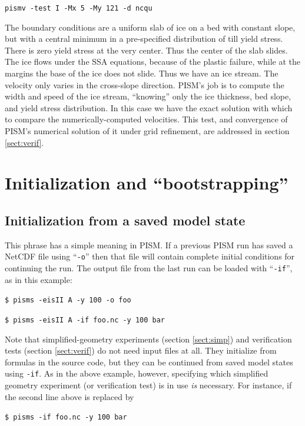 \documentclass[11pt,final]{amsart}
\begin{document}
\verb|pismv -test I -Mx 5 -My 121 -d ncqu|

\noindent The boundary conditions are a uniform slab of ice on a bed with constant slope, but with a central minimum in a pre-specified distribution of till yield stress.  There is zero yield stress at the very center.  Thus the center of the slab slides.  The ice flows under the SSA equations, because of the plastic failure, while at the margins the base of the ice does not slide.  Thus we have an ice stream.  The velocity only varies in the cross-slope direction.  PISM's job is to compute the width and speed of the ice stream, ``knowing'' only the ice thickness, bed slope, and yield stress distribution.  In this case we have the exact solution with which to compare the numerically-computed velocities.  This test, and convergence of PISM's numerical solution of it under grid refinement, are addressed in section \ref{sect:verif}.





\clearpage
\newpage
\section{Initialization and ``bootstrapping''}\label{sect:boot}  

\subsection{Initialization from a saved model state}  This phrase has a simple meaning in PISM.  If a previous PISM run has saved a NetCDF file using ``\verb|-o|'' then that file will contain complete initial conditions for continuing the run.  The output file from the last run can be loaded with ``\verb|-if|'', as in this example:

\verb|$ pisms -eisII A -y 100 -o foo|

\verb|$ pisms -eisII A -if foo.nc -y 100 bar|

\smallskip

Note that simplified-geometry experiments (section \ref{sect:simp}) and verification tests (section \ref{sect:verif}) do not need input files at all.  They initialize from formulas in the source code, but they can be continued from saved model states using \verb|-if|.  As in the above example, however, specifying which simplified geometry experiment (or verification test) is in use \emph{is} necessary.  For instance, if the second line above is replaced by

\verb|$ pisms -if foo.nc -y 100 bar|
\end{document}
